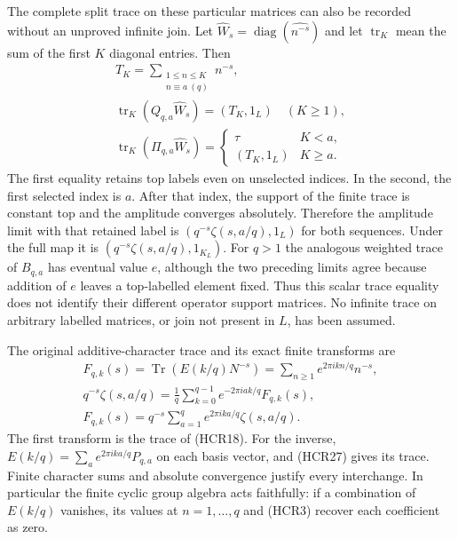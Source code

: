 The complete split trace on these particular matrices
can also be recorded without an unproved infinite join.
Let $\widehat W_s=\operatorname{diag}(\widehat{n^{-s}})$
and let $\operatorname{tr}_K$ mean the sum of the first
$K$ diagonal entries. Then
\begin{equation}\tag{HCR29}
\begin{gathered}
 T_K=\sum_{\substack{1\le n\le K\\n\equiv a\ (q)}}n^{-s},\\
 \operatorname{tr}_K(Q_{q,a}\widehat W_s)=(T_K,1_L)
                                      \quad(K\ge1),\\
 \operatorname{tr}_K(\Pi_{q,a}\widehat W_s)=
     \begin{cases}\tau&K<a,\\(T_K,1_L)&K\ge a.
     \end{cases}
\end{gathered}
\end{equation}
The first equality retains top labels even on unselected
indices. In the second, the first selected index is $a$.
After that index, the support of the finite trace is
constant top and the amplitude converges absolutely.
Therefore the amplitude limit with that retained label
is $(q^{-s}\zeta(s,a/q),1_L)$ for both sequences.
Under the full map it is
$(q^{-s}\zeta(s,a/q),1_{K_L})$.
For $q>1$ the analogous weighted trace of $B_{q,a}$
has eventual value $e$, although the two preceding
limits agree because addition of $e$ leaves a top-labelled
element fixed. Thus this scalar trace equality does not
identify their different operator support matrices.
No infinite trace on arbitrary labelled matrices, or
join not present in $L$, has been assumed.

The original additive-character trace and its exact
finite transforms are
\begin{equation}\tag{HCR30}
\begin{gathered}
 F_{q,k}(s)=\operatorname{Tr}(E(k/q)N^{-s})
           =\sum_{n\ge1}e^{2\pi i kn/q}n^{-s},\\
 q^{-s}\zeta(s,a/q)
       =\frac1q\sum_{k=0}^{q-1}e^{-2\pi i ak/q}F_{q,k}(s),\\
 F_{q,k}(s)=q^{-s}\sum_{a=1}^q
                 e^{2\pi i ka/q}\zeta(s,a/q).
\end{gathered}
\end{equation}
The first transform is the trace of (HCR18). For the
inverse, $E(k/q)=\sum_a e^{2\pi i ka/q}P_{q,a}$ on
each basis vector, and (HCR27) gives its trace. Finite
character sums and absolute convergence justify every
interchange. In particular the finite cyclic group
algebra acts faithfully: if a combination of $E(k/q)$
vanishes, its values at $n=1,\ldots,q$ and (HCR3)
recover each coefficient as zero.

